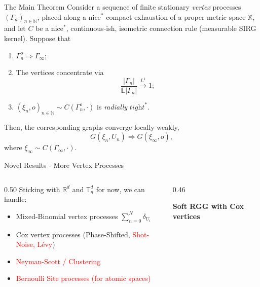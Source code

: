 \documentclass[aspectratio=169]{beamer}
\begin{document}
\begin{frame}{The Main Theorem}
Consider a sequence of finite stationary \textit{vertex} processes $(\Gamma_n)_{n \in \mathbb{N}}$, placed along a $\text{nice}^*$ compact exhaustion of a proper metric space $\mathbb{X}$, and let $C$ be a $\text{nice}^*$, continuous-ish, isometric connection rule (measurable SIRG kernel). Suppose that
\begin{enumerate}
    \item $\Gamma_n^{o} \Rightarrow \Gamma_\infty$; 
    \item The vertices concentrate via 
    $$\frac{|\Gamma_n|}{\mathbb{E}|\Gamma_n|}\overset{L^1}{\longrightarrow} 1;$$
    \item $(\xi_n, o)_{n \in \mathbb{N}} \sim C(\Gamma_n^{o}, \cdot)$ is \textit{radially} $\textit{tight}^*$.
\end{enumerate}
Then, the corresponding graphs converge locally weakly, $$G(\xi_n, U_n) \Rightarrow G(\xi_\infty, o),$$ where $\xi_\infty \sim C(\Gamma_\infty, \cdot)$. 
\end{frame}

\begin{frame}{Novel Results - More Vertex Processes}
\begin{columns}[T,onlytextwidth]
    \begin{column}{0.50\textwidth}
        Sticking with $\mathbb{R}^d$ and $\mathbb{T}^d_n$ for now, we can handle:
        \begin{itemize}
            \item Mixed-Binomial vertex processes $\sum_{n=0}^N \delta_{U_i}$
            \item Cox vertex processes (Phase-Shifted, \textcolor{red}{Shot-Noise, Lévy})
            \item \textcolor{red}{Neyman-Scott / Clustering}
            \item \textcolor{red}{Bernoulli Site processes (for atomic spaces)}
        \end{itemize}
    \end{column}
    \begin{column}{0.46\textwidth}
        \centering
        \resizebox{\linewidth}{!}{}
        \par\vspace{0.12cm}
        \textbf{Soft RGG with Cox vertices}
    \end{column}
\end{columns}
\end{frame}
\end{document}
